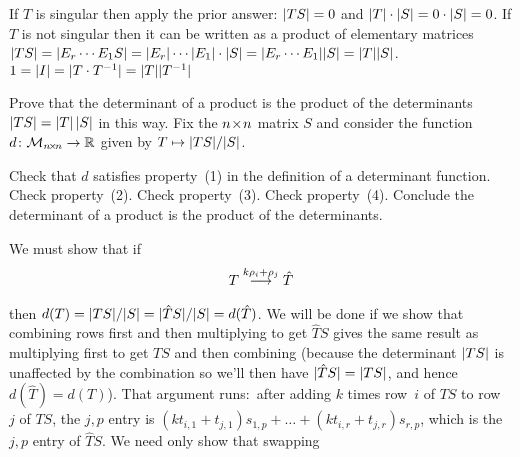 \begin{exercises}
\begin{answer}
\begin{exparts}
        \partsitem If \( T \) is singular then apply the prior answer:
          \( \deter{TS}=0 \) and
          \( \deter{T}\cdot\deter{S}=0\cdot\deter{S}=0 \).
          If \( T \) is not singular then it can be written as a product of
          elementary matrices
          $
            \deter{TS}=\deter{E_r\cdots E_1S}=
            \deter{E_r}\cdots\deter{E_1}\cdot\deter{S}=
            \deter{E_r\cdots E_1}\deter{S}=\deter{T}\deter{S}
          $.
        \partsitem \( 1=\deter{I}=\deter{T\cdot T^{-1}}
                     =\deter{T}\deter{T^{-1}} \)
      \end{exparts}  
     \end{answer} 
  \item 
    Prove that the determinant of a product is the product of the
    determinants \( \deter{TS}=\deter{T}\,\deter{S} \) in this way.
    Fix the \( n \! \times \! n \) matrix \( S \) and consider the function
    \( \mbox{$d\colon \mathcal{M}_{n \! \times \! n}\to \mathbb{R}$} \) given by
    \( T\mapsto \deter{TS}/\deter{S} \).
    \begin{exparts}
      \partsitem Check that \( d \) satisfies property~(1) in the definition of
        a determinant function.
      \partsitem Check property~(2).
      \partsitem Check property~(3).
      \partsitem Check property~(4).
      \partsitem Conclude the determinant of a product is the product of the
        determinants.
    \end{exparts}
    \begin{answer}
      \begin{exparts}
        \partsitem We must show that if
          \begin{equation*}
            T\mathrel{ \mathop{\longrightarrow}\limits^{k\rho_i+\rho_j\mathstrut}_{ \begin{subarray}{l} \relax \end{subarray}}}\hat{T}
          \end{equation*}
          then $d(T)=\deter{TS}/\deter{S}
          =\deter{\hat{T}S}/\deter{S}=d(\hat{T})$.
          We will be done if we show that combining rows first and
          then multiplying to get \( \hat{T}S \) gives the same result as
          multiplying first to get \( TS \) and then combining
          (because the determinant \( \deter{TS} \) is unaffected by the
          combination so we'll then have \( \deter{\hat{T}S}=\deter{TS} \), and
          hence \( d(\hat{T})=d(T) \)).
          That argument runs:~after adding 
          \( k \) times row~\( i \) of \( TS \) to
          row~$j$ of \( TS \), the \( j,p \) entry is
          \( (kt_{i,1}+t_{j,1})s_{1,p}+\dots+(kt_{i,r}+t_{j,r})s_{r,p} \),
          which is the \( j,p \) entry of \( \hat{T}S \).
        \partsitem We need only show that swapping

\end{exparts}
\end{answer}
\end{exercises}
